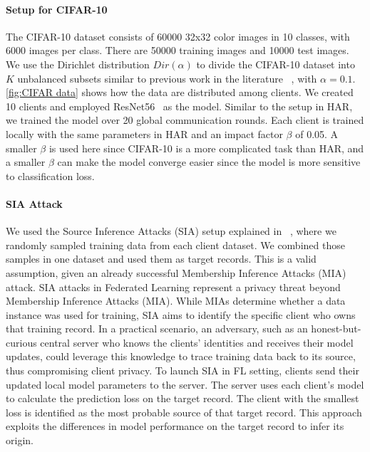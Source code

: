 \paragraph{\textbf{Setup for CIFAR-10}}
The CIFAR-10 dataset consists of 60000 32x32 color images in 10 classes, with 6000 images per class. There are 50000 training images and 10000 test images. We use the Dirichlet distribution $Dir(\alpha)$ to divide the CIFAR-10 dataset into $K$ unbalanced subsets similar to previous work in the literature ~\cite{mendieta2022local,BG_SIA_2}, with $\alpha=0.1$. \autoref{fig:CIFAR data} shows how the data are distributed among clients. We created 10 clients and employed ResNet56~\cite{he2016deep} as the model. Similar to the setup in HAR, we trained the model over 20 global communication rounds. Each client is trained locally with the same parameters in HAR and an impact factor $\beta$ of 0.05. A smaller $\beta$ is used here since CIFAR-10 is a more complicated task than HAR, and a smaller $\beta$ can make the model converge easier since the model is more sensitive to classification loss.



\paragraph{\textbf{SIA Attack}} We used the Source Inference Attacks (SIA) setup explained in ~\cite{hu2023source}, where we randomly sampled training data from each client dataset. We combined those samples in one dataset and used them as target records. This is a valid assumption, given an already successful Membership Inference Attacks (MIA) attack. SIA attacks in Federated Learning represent a privacy threat beyond Membership Inference Attacks (MIA). While MIAs determine whether a data instance was used for training, SIA aims to identify the specific client who owns that training record. In a practical scenario, an adversary, such as an honest-but-curious central server who knows the clients' identities and receives their model updates, could leverage this knowledge to trace training data back to its source, thus compromising client privacy. To launch SIA in FL setting,  clients send their updated local model parameters to the server. The server uses each client's model to calculate the prediction loss on the target record. The client with the smallest loss is identified as the most probable source of that target record. This approach exploits the differences in model performance on the target record to infer its origin.


